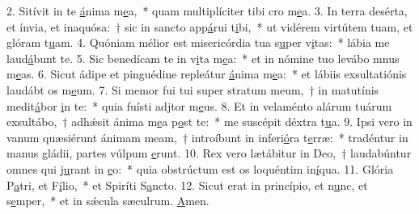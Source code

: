 2. Sitívit in te \uline{á}nima m\uline{e}a,~* quam multiplíciter tibi cro m\uline{e}a.
3. In terra desérta, et ínvia, et inaquósa:~† sic in sancto app\uline{á}rui t\uline{i}bi,~* ut vidérem virtútem tuam, et glóram t\uline{u}am.
4. Quóniam mélior est misericórdia tua s\uline{u}per v\uline{i}tas:~* lábia me laud\uline{á}bunt te.
5. Sic benedícam te in v\uline{i}ta m\uline{e}a:~* et in nómine tuo levábo mnus m\uline{e}as.
6. Sicut ádipe et pinguédine repleátur \uline{á}nima m\uline{e}a:~* et lábiis exsultatiónis laudábt os m\uline{e}um.
7. Si memor fui tui super stratum meum,~† in matutínis medit\uline{á}bor \uline{i}n te:~* quia fuísti adjtor m\uline{e}us.
8. Et in velaménto alárum tuárum exsultábo,~† adhǽsit ánima m\uline{e}a p\uline{o}st te:~* me suscépit déxtra t\uline{u}a.
9. Ipsi vero in vanum quæsiérunt ánimam meam,~† introíbunt in inferi\uline{ó}ra t\uline{e}rræ:~* tradéntur in manus gládii, partes vúlpum \uline{e}runt.
10. Rex vero lætábitur in Deo,~† laudabúntur omnes qui j\uline{u}rant in \uline{e}o:~* quia obstrúctum est os loquéntim in\uline{í}qua.
11. Glória P\uline{a}tri, et F\uline{í}lio,~* et Spiríti S\uline{a}ncto.
12. Sicut erat in princípio, et n\uline{u}nc, et s\uline{e}mper,~* et in sǽcula sæculrum. \uline{A}men.
